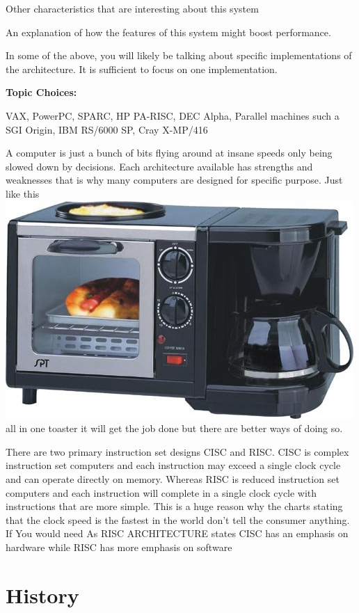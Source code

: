 \documentclass[letterpaper,12pt,titlepage]{article}
\begin{document}
Other characteristics that are interesting about this system

An explanation of how the features of this system might boost performance.

In some of the above, you will likely be talking about specific implementations of the architecture. It is sufficient to focus on one implementation.

\textbf{Topic Choices:}

VAX,
PowerPC,
SPARC,
HP PA-RISC,
DEC Alpha,
Parallel machines such a SGI Origin, IBM RS/6000 SP, Cray X-MP/416
\newpage
\begin{multicols}{2}
A computer is just a bunch of bits flying around at insane speeds only being slowed down by decisions. Each architecture available has strengths and weaknesses that is why many computers are designed for specific purpose. Just like this \includegraphics[scale=0.46]{multiMachine.jpg} all in one toaster it will get the job done but there are better ways of doing so. 

There are two primary instruction set designs CISC and RISC. CISC is complex instruction set computers and each instruction may exceed a single clock cycle and can operate directly on memory. Whereas RISC is reduced instruction set computers and each instruction will complete in a single clock cycle with instructions that are more simple. This is a huge reason why the charts stating that the clock speed is the fastest in the world don't tell the consumer anything. If You would need As RISC ARCHITECTURE \cite{RISC} states CISC has an emphasis on hardware while RISC has more emphasis on software
\section*{History }

\end{multicols}
\end{document}
